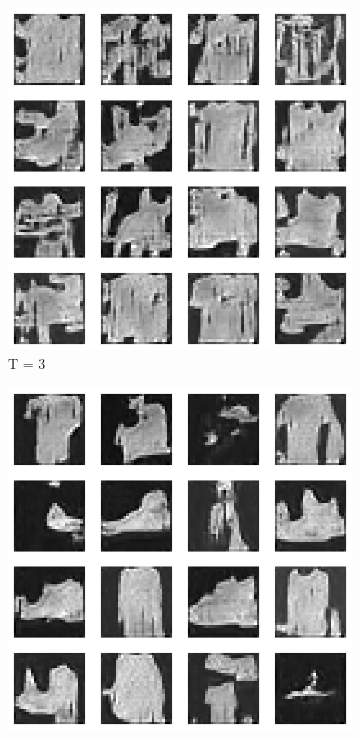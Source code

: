 \documentclass{article}
\begin{document}
\begin{figure}[H]
	\begin{subfigure}[h]{0.3\linewidth}
		\centering
		\includegraphics[scale=0.3]{../code/figures/generated_DDGAN_rkl_3.png}
		\caption{T = 3}
	\end{subfigure}
	\hfill
	\begin{subfigure}[h]{0.3\linewidth}
		\centering
		\includegraphics[scale=0.3]{../code/figures/generated_DDGAN_rkl_5.png}

\end{subfigure}
\end{figure}
\end{document}
